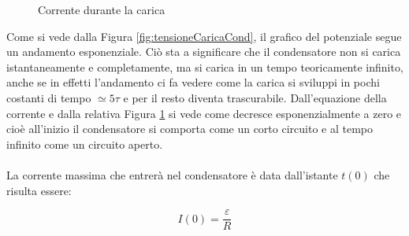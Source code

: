 \begin{figure}[H]
    \centering
    \caption{Corrente durante la carica}
    \label{fig:CorrenteCaricaCond}
\end{figure}

Come si vede dalla Figura \ref{fig:tensioneCaricaCond}, il grafico del potenziale segue un andamento esponenziale. Ciò sta a significare che il condensatore non si carica istantaneamente e completamente, ma si carica in un tempo teoricamente infinito, anche se in effetti l'andamento ci fa vedere come la carica si sviluppi in pochi costanti di tempo $\simeq 5\tau$ e per il resto diventa trascurabile. Dall'equazione della corrente e dalla relativa Figura \ref{fig:CorrenteCaricaCond} si vede come decresce esponenzialmente a zero e cioè all'inizio il condensatore si comporta come un corto circuito e al tempo infinito come un circuito aperto.

\paragraph{}
La corrente massima che entrerà nel condensatore è data dall'istante $t(0)$ che risulta essere:

\begin{equation}
    I(0) = \frac{\varepsilon}{R}
\end{equation}

